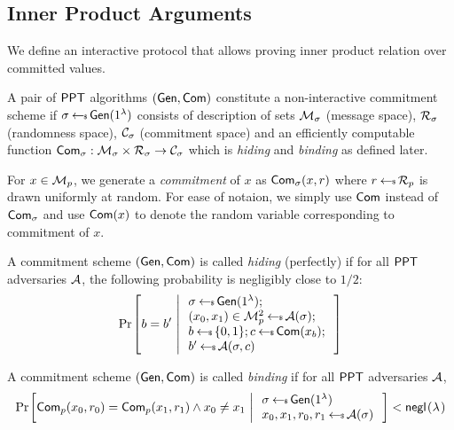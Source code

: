 
\subsection{Inner Product Arguments}
We define an interactive protocol that allows proving inner product relation
over committed values. 
\begin{definition}\label{defn:commscheme}
 A pair of $\mathsf{PPT}$ algorithms
$(\mathsf{Gen},\mathsf{Com})$ constitute a non-interactive commitment scheme if
$\sigma\hskip2.3pt{\gets\!\!\mbox{\tiny${\$}$\normalsize}}\, \mathsf{Gen}(1^{\lambda})$ consists of description of sets
$\mathcal{M}_\sigma$ (message space), $\mathcal{R}_\sigma$ (randomness space),
$\mathcal{C}_\sigma$ (commitment space) and an efficiently computable function 
$\mathsf{Com}_\sigma: \mathcal{M}_\sigma\times \mathcal{R}_\sigma\rightarrow \mathcal{C}_\sigma$ which is {\em hiding} and {\em binding} as defined later.
\end{definition}

For $x\in \mathcal{M}_p$, we generate a {\em commitment} of $x$
as $\mathsf{Com}_\sigma(x,r)$ where $r\hskip2.3pt{\gets\!\!\mbox{\tiny${\$}$\normalsize}}\, \mathcal{R}_p$ is drawn uniformly at random. For ease
of notaion, we simply use $\mathsf{Com}$ instead of $\mathsf{Com}_\sigma$ and use $\mathsf{Com}(x)$ to denote the random variable corresponding to commitment of $x$. 

\begin{definition}\label{defn:hidingcomm}
A commitment scheme $(\mathsf{Gen},\mathsf{Com})$ is called {\em hiding} (perfectly) if for
all $\mathsf{PPT}$ adversaries $\mathcal{A}$, the following probability is negligibly close to
$1/2$:
\begin{align*}
\condprob{b=b'}{
\begin{array}{l}
\sigma\sample \csetup(\secparam); \\
(x_0,x_1)\in \mc{M}^2_p\sample \adv(\sigma); \\
b\sample \{0,1\}; c\sample \comm(x_b);\\
b'\sample \adv(\sigma,c)
\end{array}
}
\end{align*}
\end{definition}

\begin{definition}\label{defn:bindingcomm}
A commitment scheme $(\mathsf{Gen},\mathsf{Com})$ is called {\em binding} if for all $\mathsf{PPT}$
adversaries $\mathcal{A}$, 
\begin{align*}
\condprob{\comm_p(x_0,r_0)=\comm_p(x_1,r_1)\wedge x_0\neq x_1}{
\begin{array}{l}
\sigma\sample \csetup(\secparam) \\
x_0,x_1,r_0,r_1 \sample \adv(\sigma)
\end{array}
} < \negl
\end{align*}

\end{definition}


